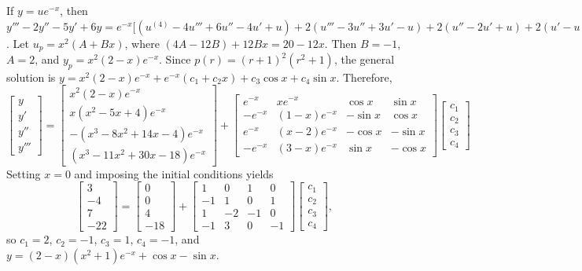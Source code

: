 \documentclass[dvips]{book}
\renewcommand{\exer}[1]{\par\medskip\;\noindent{\color{red}\bf #1.}}
\numberwithin{example}{section}
\numberwithin{equation}{section}
\numberwithin{theorem}{section}
\numberwithin{table}{section}
\numberwithin{figure}{section}
\begin{document}
\exer{9.3.72}
 If $y=ue^{-x}$, then $y'''-2y''-5y'+6y=e^{-x}[
(u^{(4)}-4u'''+6u''-4u'+u) +2(u'''-3u''+3u'-u) +2(u''-2u'+u) +2(u'-u)
+u=e^{-x}(u^{(4)}-2u'''+2u'')$. Let $u_p=x^2(A+Bx)$, where
$(4A-12B)+12Bx=20-12x$. Then $B=-1$,
 $A=2$, and $y_p=x^2(2-x)e^{-x}$. Since $p(r)=(r+1)^2(r^2+1)$,
the general solution is
$y=x^2(2-x)e^{-x}+e^{-x}(c_1+c_2x)+c_3\cos x+c_4\sin x$.
 Therefore,
$$
\left[\begin{array}{l}y\\y'\\y''\\y'''\end{array}\right]=
\left[\begin{array}{c}
x^2(2-x)e^{-x}\\
x(x^2-5x+4)e^{-x}\\
-(x^3-8x^2+14x-4)e^{-x}\\
(x^3-11x^2+30x-18)e^{-x}
\end{array}\right]+
\left[\begin{array}{rcrr}e^{-x}&xe^{-x}&\cos x&\sin x\\
-e^{-x}&(1-x)e^{-x}&-\sin x&\cos x\\
e^{-x}&(x-2)e^{-x}&-\cos x&-\sin x\\
-e^{-x}&(3-x)e^{-x}&\sin x&-\cos x\end{array}\right]
\left[\begin{array}{c}
c_1\\c_2\\c_3\\c_4
\end{array}\right]
$$
Setting $x=0$ and imposing the initial conditions yields
$$
\left[\begin{array}{r}
3\\-4\\7\\-22
\end{array}\right]=
\left[\begin{array}{r}
0\\0\\4\\-18
\end{array}\right]+
\left[\begin{array}{rrrr}1&0&1&0\\-1&1&0&1\\
1&-2&-1&0\\-1&3&0&-1\end{array}\right]
\left[\begin{array}{c}
c_1\\c_2\\c_3\\c_4
\end{array}\right],
$$
so $c_1=2$, $c_2=-1$, $c_3=1$, $c_4=-1$, and
$y=(2-x)(x^2+1)e^{-x}+\cos x-\sin x$.
\end{document}
